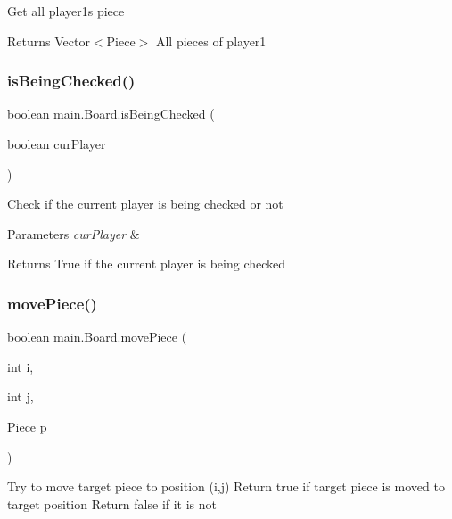 Get all player1\textquotesingle{}s piece

\begin{DoxyReturn}{Returns}
Vector$<$\+Piece$>$ All pieces of player1 
\end{DoxyReturn}
\mbox{\label{classmain_1_1_board_a46af849ead21cb70f0b5125ad990925c}} 
\subsubsection{\texorpdfstring{isBeingChecked()}{isBeingChecked()}}
{\footnotesize\ttfamily boolean main.\+Board.\+is\+Being\+Checked (\begin{DoxyParamCaption}\item[{boolean}]{cur\+Player }\end{DoxyParamCaption})\hspace{0.3cm}{\ttfamily [inline]}}

Check if the current player is being checked or not 
\begin{DoxyParams}{Parameters}
{\em cur\+Player} & \\
\hline
\end{DoxyParams}
\begin{DoxyReturn}{Returns}
True if the current player is being checked 
\end{DoxyReturn}
\mbox{\label{classmain_1_1_board_a6652d7432f1ce0fa3592d5de0758d7af}} 
\subsubsection{\texorpdfstring{movePiece()}{movePiece()}}
{\footnotesize\ttfamily boolean main.\+Board.\+move\+Piece (\begin{DoxyParamCaption}\item[{int}]{i,  }\item[{int}]{j,  }\item[{\mbox{\hyperlink{classmain_1_1_piece}{Piece}}}]{p }\end{DoxyParamCaption})\hspace{0.3cm}{\ttfamily [inline]}}

Try to move target piece to position (i,j) Return true if target piece is moved to target position Return false if it is not


